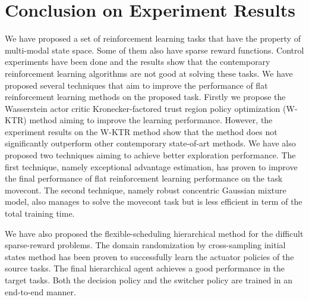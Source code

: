 \section{Conclusion on Experiment Results}
We have proposed a set of reinforcement learning tasks that have the property of multi-modal state space. Some of them also have sparse reward functions. Control experiments have been done and the results show that the contemporary reinforcement learning algorithms are not good at solving these tasks.
We have proposed several techniques that aim to improve the performance of flat reinforcement learning methods on the proposed task. Firstly we propose the Wasserstein actor critic Kronecker-factored trust region policy optimization (W-KTR) method aiming to improve the learning performance. However, the experiment results on the W-KTR method show that the method does not significantly outperform other contemporary state-of-art methods. We have also proposed two techniques aiming to achieve better exploration performance. The first technique, namely exceptional advantage estimation, has proven to improve the final performance of flat reinforcement learning performance on the task movecont. The second technique, namely robust concentric Gaussian mixture model, also manages to solve the movecont task but is less efficient in term of the total training time. 


We have also proposed the flexible-scheduling hierarchical method for the difficult sparse-reward problems. The domain randomization by cross-sampling initial states method has been proven to successfully learn the actuator policies of the source tasks. The final hierarchical agent achieves a good performance in the target tasks. Both the decision policy and the switcher policy are trained in an end-to-end manner. 